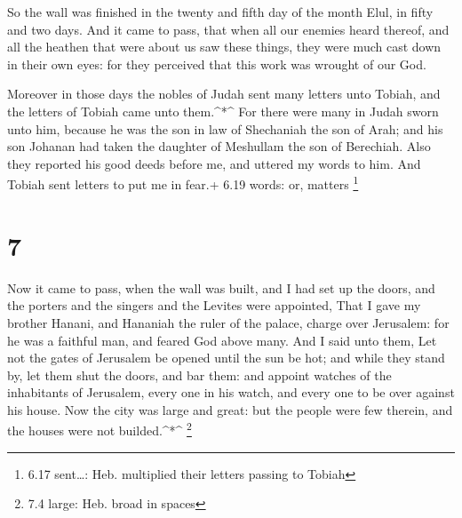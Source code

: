  So the wall was finished in the twenty and fifth day of
the month Elul, in fifty and two days.  And it came to
pass, that when all our enemies heard thereof, and all the heathen that
were about us saw these things, they were much cast down in their own
eyes: for they perceived that this work was wrought of our God.

 Moreover in those days the nobles of Judah sent many
letters unto Tobiah, and the letters of Tobiah came unto them.\^{}*\^{}
 For there were many in Judah sworn unto him, because he
was the son in law of Shechaniah the son of Arah; and his son Johanan
had taken the daughter of Meshullam the son of Berechiah. 
Also they reported his good deeds before me, and uttered my words to
him. And Tobiah sent letters to put me in fear.+ 6.19 words: or, matters
\footnote{6.17 sent\ldots: Heb. multiplied their letters passing to
  Tobiah}

\hypertarget{section-6}{%
\section{7}\label{section-6}}

 Now it came to pass, when the wall was built, and I had set
up the doors, and the porters and the singers and the Levites were
appointed,  That I gave my brother Hanani, and Hananiah the
ruler of the palace, charge over Jerusalem: for he was a faithful man,
and feared God above many.  And I said unto them, Let not
the gates of Jerusalem be opened until the sun be hot; and while they
stand by, let them shut the doors, and bar them: and appoint watches of
the inhabitants of Jerusalem, every one in his watch, and every one to
be over against his house.  Now the city was large and
great: but the people were few therein, and the houses were not
builded.\^{}*\^{} \footnote{7.4 large: Heb. broad in spaces}

